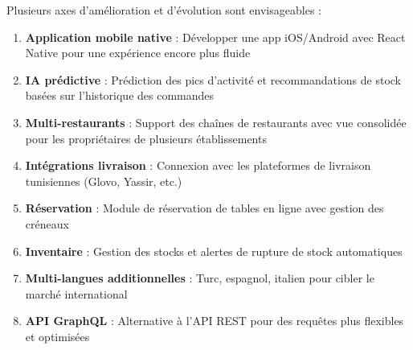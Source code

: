 \documentclass[12pt,a4paper]{report}
\begin{document}
Plusieurs axes d'amélioration et d'évolution sont envisageables :

\begin{enumerate}[leftmargin=1.5cm, itemsep=0.3cm]
    \item \textbf{Application mobile native} : Développer une app iOS/Android avec React Native pour une expérience encore plus fluide
    \item \textbf{IA prédictive} : Prédiction des pics d'activité et recommandations de stock basées sur l'historique des commandes
    \item \textbf{Multi-restaurants} : Support des chaînes de restaurants avec vue consolidée pour les propriétaires de plusieurs établissements
    \item \textbf{Intégrations livraison} : Connexion avec les plateformes de livraison tunisiennes (Glovo, Yassir, etc.)
    \item \textbf{Réservation} : Module de réservation de tables en ligne avec gestion des créneaux
    \item \textbf{Inventaire} : Gestion des stocks et alertes de rupture de stock automatiques
    \item \textbf{Multi-langues additionnelles} : Turc, espagnol, italien pour cibler le marché international
    \item \textbf{API GraphQL} : Alternative à l'API REST pour des requêtes plus flexibles et optimisées
\end{enumerate}

\begin{center}
    \vspace{1cm}
\end{center}
\end{document}
